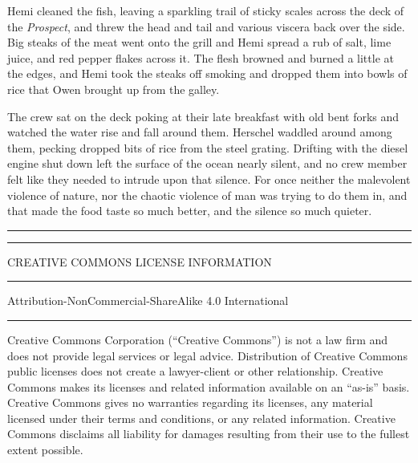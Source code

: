 \documentclass[
]{scrbook}
\begin{document}
Hemi cleaned the fish, leaving a sparkling trail of sticky scales across
the deck of the \emph{Prospect}, and threw the head and tail and various
viscera back over the side. Big steaks of the meat went onto the grill
and Hemi spread a rub of salt, lime juice, and red pepper flakes across
it. The flesh browned and burned a little at the edges, and Hemi took
the steaks off smoking and dropped them into bowls of rice that Owen
brought up from the galley.

The crew sat on the deck poking at their late breakfast with old bent
forks and watched the water rise and fall around them. Herschel waddled
around among them, pecking dropped bits of rice from the steel grating.
Drifting with the diesel engine shut down left the surface of the ocean
nearly silent, and no crew member felt like they needed to intrude upon
that silence. For once neither the malevolent violence of nature, nor
the chaotic violence of man was trying to do them in, and that made the
food taste so much better, and the silence so much quieter.

\newpage
\tiny
\begin{center}\rule{0.5\linewidth}{0.5pt}\end{center}

\begin{center}\rule{0.5\linewidth}{0.5pt}\end{center}

CREATIVE COMMONS LICENSE INFORMATION

\begin{center}\rule{0.5\linewidth}{0.5pt}\end{center}

Attribution-NonCommercial-ShareAlike 4.0 International

\begin{center}\rule{0.5\linewidth}{0.5pt}\end{center}

Creative Commons Corporation (``Creative Commons'') is not a law firm
and does not provide legal services or legal advice. Distribution of
Creative Commons public licenses does not create a lawyer-client or
other relationship. Creative Commons makes its licenses and related
information available on an ``as-is'' basis. Creative Commons gives no
warranties regarding its licenses, any material licensed under their
terms and conditions, or any related information. Creative Commons
disclaims all liability for damages resulting from their use to the
fullest extent possible.
\end{document}
